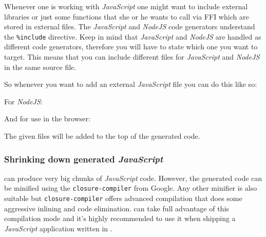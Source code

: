 \noindent
Whenever one is working with \emph{JavaScript} one might want to include
external libraries or just some functions that she or he wants to call via
FFI which are stored in external files. The \emph{JavaScript} and \emph{NodeJS} code generators
understand the \texttt{\%include} directive. Keep in mind that \emph{JavaScript} and \emph{NodeJS}
are handled as different code generators, therefore you will have to state which one you want to target.
This means that you can include different files for \emph{JavaScript} and \emph{NodeJS} in the same
\Idris{} source file.

\noindent
So whenever you want to add an external \emph{JavaScript} file
you can do this like so:

\noindent
For \emph{NodeJS}:

\begin{code}
\end{code}

\noindent
And for use in the browser:

\begin{code}
\end{code}

\noindent
The given files will be added to the top of the generated code.

\subsubsection*{Shrinking down generated \emph{JavaScript}}

\Idris{} can produce very big chunks of \emph{JavaScript} code.
However, the generated code can be minified using the \texttt{closure-compiler} from Google.
Any other minifier is also suitable but \texttt{closure-compiler} offers advanced compilation that does some aggressive inlining and code elimination.
\Idris{} can take full advantage of this compilation mode and it's highly recommended to use it when shipping a \emph{JavaScript} application written in \Idris{}.

